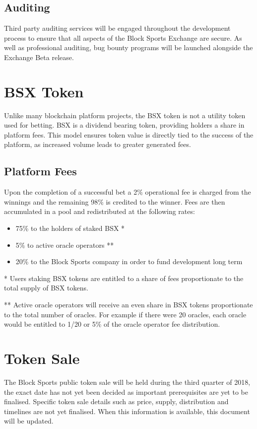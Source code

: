 \documentclass{article}
\begin{document}
	\subsection{Auditing}
Third party auditing services will be engaged throughout the development process to ensure that all aspects of the Block Sports Exchange are secure. As well as professional auditing, 
bug bounty programs will be launched alongside the Exchange Beta release. 
	
\section{BSX Token}

Unlike many blockchain platform projects, the BSX token is not a utility token used for betting. BSX is a dividend bearing token, providing holders a share in platform fees. This model ensures token value is directly tied to the success of the platform, as increased volume leads to greater generated fees. 

	\subsection{Platform Fees}
Upon the completion of a successful bet a 2\% operational fee is charged from the winnings and the remaining 98\% is credited to the winner. Fees are then accumulated in a pool and redistributed at the following rates:

\begin{itemize}
	\item 75\% to the holders of staked BSX *
	\item 5\% to active oracle operators **
	\item 20\% to the Block Sports company in order to fund development long term

\end{itemize}

* Users staking BSX tokens are entitled to a share of fees proportionate to the total supply of BSX tokens. 

** Active oracle operators will receive an even share in BSX tokens proportionate to the total number of oracles. For example if there were 20 oracles, each oracle would be entitled to 1/20 or 5\% of the oracle operator fee distribution.

\section{Token Sale}
The Block Sports public token sale will be held during the third quarter of 2018, the exact date has not yet been decided as important prerequisites are yet to be finalised. Specific token sale details such as price, supply, distribution and timelines are not yet finalised. When this information is available, this document will be updated.
\end{document}
